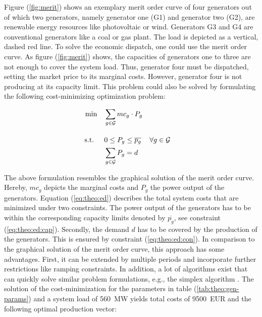 Figure (\ref{fig:merit}) shows an exemplary merit order curve of four generators out of which two generators, namely generator one (G1) and generator two (G2), are renewable energy resources like photovoltaic or wind. Generators G3 and G4 are conventional generators like a coal or gas plant. The load is depicted as a vertical, dashed red line. To solve the economic dispatch, one could use the merit order curve. As figure (\ref{fig:merit}) shows, the capacities of generators one to three are not enough to cover the system load. Thus, generator four must be dispatched, setting the market price to its marginal costs. However, generator four is not producing at its capacity limit. This problem could also be solved by formulating the following cost-minimizing optimization problem:

\begin{subequations}
	\begin{align}
		 \min \quad & \sum_{g\in\mathcal{G}}mc_g \cdot P_{g} \label{eq:theo:ed} \\[10pt]
		 \text{s.t. } \quad & 0 \leq P_{g} \leq \overline{p_g} && \forall g \in \mathcal{G} \label{eq:theo:ed:cap} \\
		 & \sum_{g \in \mathcal{G}} P_{g} = d \label{eq:theo:ed:con}
	\end{align}
\end{subequations}

The above formulation resembles the graphical solution of the merit order curve. Hereby, $mc_g$ depicts the marginal costs and $P_g$ the power output of the generators. Equation (\ref{eq:theo:ed}) describes the total system costs that are minimized under two constraints. The power output of the generators has to be within the corresponding capacity limits denoted by $\overline{p_g}$, see constraint (\ref{eq:theo:ed:cap}). Secondly, the demand $d$ has to be covered by the production of the generators. This is ensured by constraint (\ref{eq:theo:ed:con}). In comparison to the graphical solution of the merit order curve, this approach has some advantages. First, it can be extended by multiple periods and incorporate further restrictions like ramping constraints. In addition, a lot of algorithms exist that can quickly solve similar problem formulations, e.g., the simplex algorithm \citep{dantzig1963}. The solution of the cost-minimization for the parameters in table (\ref{tab:theo:gen-params}) and a system load of \SI{560}{\mega\watt} yields total costs of \SI{9500}{EUR} and the following optimal production vector:

